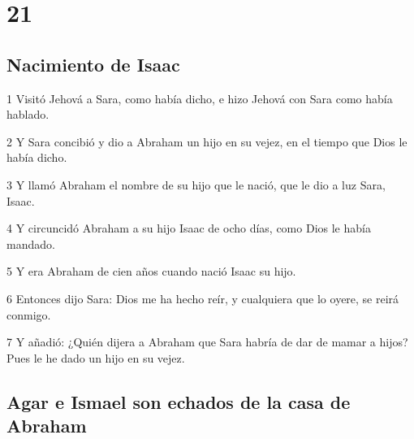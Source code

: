 \chapter{21}

\section*{Nacimiento de Isaac}

\par 1 Visitó Jehová a Sara, como había dicho, e hizo Jehová con Sara como había hablado.
\par 2 Y Sara concibió y dio a Abraham un hijo en su vejez, en el tiempo que Dios le había dicho.
\par 3 Y llamó Abraham el nombre de su hijo que le nació, que le dio a luz Sara, Isaac.
\par 4 Y circuncidó Abraham a su hijo Isaac de ocho días, como Dios le había mandado.
\par 5 Y era Abraham de cien años cuando nació Isaac su hijo.
\par 6 Entonces dijo Sara: Dios me ha hecho reír, y cualquiera que lo oyere, se reirá conmigo.
\par 7 Y añadió: ¿Quién dijera a Abraham que Sara habría de dar de mamar a hijos? Pues le he dado un hijo en su vejez.

\section*{Agar e Ismael son echados de la casa de Abraham}

